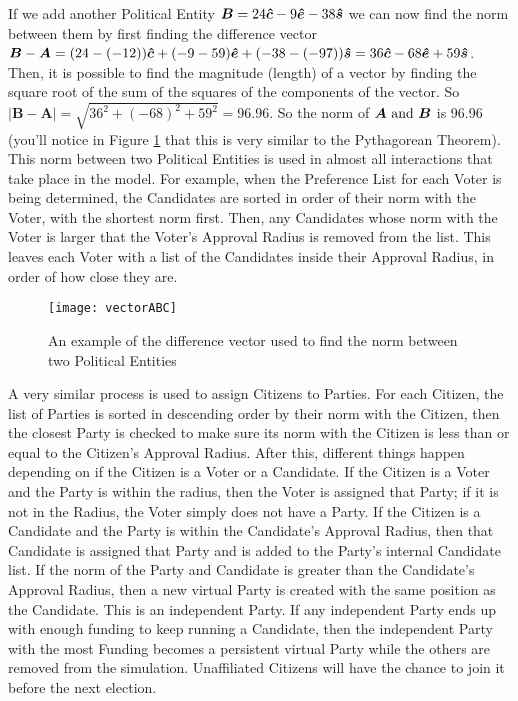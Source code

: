 \documentclass[12pt]{article}
\newcommand{\civ}{\vhat{c}}
\newcommand{\econ}{\vhat{e}}
\newcommand{\soc}{\vhat{s}}
\begin{document}
\qquad If we add another Political Entity $\bm{B} = 24\civ - 9\econ - 38\soc$ we can now find the norm between them by first finding the difference vector $\bm{B} - \bm{A} = (24 - (- 12))\civ + (-9 - 59)\econ + (-38 - (- 97))\soc = 36\civ - 68\econ + 59\soc$. Then, it is possible to find the magnitude (length) of a vector by finding the square root of the sum of the squares of the components of the vector. So $|\bm{B} - \bm{A}| = \sqrt{36^2 + (-68)^2 + 59^2} = 96.96$. So the norm of $\bm{A} \hbox{ and } \bm{B}$ is 96.96 (you'll notice in Figure \ref{exNorm} that this is very similar to the Pythagorean Theorem). This norm between two Political Entities is used in almost all interactions that take place in the model. For example, when the Preference List for each Voter is being determined, the Candidates are sorted in order of their norm with the Voter, with the shortest norm first. Then, any Candidates whose norm with the Voter is larger that the Voter's Approval Radius is removed from the list. This leaves each Voter with a list of the Candidates inside their Approval Radius, in order of how close they are.
\begin{figure}[H]
\centering
\texttt{[image: vectorABC]}
\caption{\footnotesize An example of the difference vector used to find the norm between two Political Entities}
\label{exNorm}
\end{figure}

\qquad A very similar process is used to assign Citizens to Parties. For each Citizen, the list of Parties is sorted in descending order by their norm with the Citizen, then the closest Party is checked to make sure its norm with the Citizen is less than or equal to the Citizen's Approval Radius. After this, different things happen depending on if the Citizen is a Voter or a Candidate. If the Citizen is a Voter and the Party is within the radius, then the Voter is assigned that Party; if it is not in the Radius, the Voter simply does not have a Party. If the Citizen is a Candidate and the Party is within the Candidate's Approval Radius, then that Candidate is assigned that Party and is added to the Party's internal Candidate list. If the norm of the Party and Candidate is greater than the Candidate's Approval Radius, then a new virtual Party is created with the same position as the Candidate. This is an independent Party. If any independent Party ends up with enough funding to keep running a Candidate, then the independent Party with the most Funding becomes a persistent virtual Party while the others are removed from the simulation. Unaffiliated Citizens will have the chance to join it before the next election. \\
\end{document}
